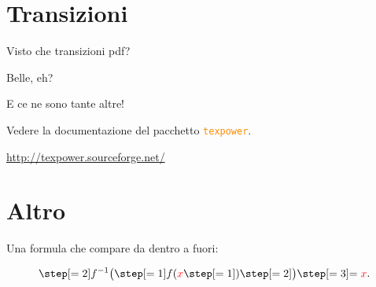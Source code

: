\documentclass[12pt,italian,oneside]{report}
\begin{document}

\section{Transizioni}


\begin{firstheadlineitemize}

\item Visto che transizioni pdf?

\pause

\begin{secondheadlineitemize}

\item Belle, eh?

\end{secondheadlineitemize}

\pause


\item E ce ne sono tante altre!

\pause

\begin{secondheadlineitemize}

\pageTransitionSplitVO

\item {\setlength{\baselineskip}{2\baselineskip}
Vedere la documentazione del pacchetto \textcolor{darkorange}{\texttt{texpower}}.
}

\end{secondheadlineitemize}

\end{firstheadlineitemize}

\pause

\begin{center}
\url{http://texpower.sourceforge.net/}
\end{center}

\pageTransitionReplace
\section{Altro}

\begin{secondheadlineitemize}

\item[] Una formula che compare da dentro a fuori:

\pause

 \parstepwise
  {$$\step[\value{step}=2]{f^{-1}\bigl(}
    \step[\value{step}=1]{f(}
    \textcolor{red}{x}
    \step[\value{step}=1]{)}
    \step[\value{step}=2]{\bigr)}
    \step[\value{step}=3]{=\textcolor{red}{x}.}$$
    }

\end{secondheadlineitemize}


\end{document}
